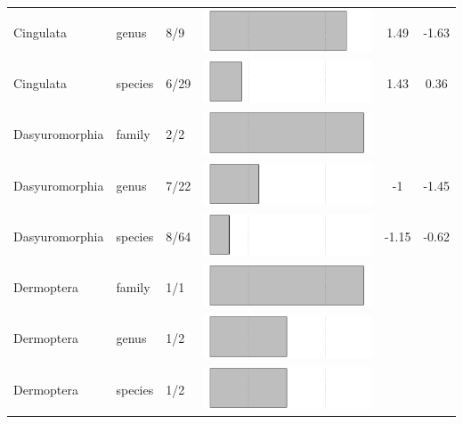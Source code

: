 \begin{longtable}{lL{1.8cm}C{2cm}lcc}
  Cingulata & genus & 8/9 & \includegraphics[width=0.20\linewidth, height=0.05\linewidth]{Missing_mammals/Table_figures/bar14.pdf} & 1.49 & -1.63 \\ 
  Cingulata & species & 6/29 & \includegraphics[width=0.20\linewidth, height=0.05\linewidth]{Missing_mammals/Table_figures/bar15.pdf} & 1.43 & 0.36 \\ 
  Dasyuromorphia & family & 2/2 & \includegraphics[width=0.20\linewidth, height=0.05\linewidth]{Missing_mammals/Table_figures/bar16.pdf} &   &   \\ 
  Dasyuromorphia & genus & 7/22 & \includegraphics[width=0.20\linewidth, height=0.05\linewidth]{Missing_mammals/Table_figures/bar17.pdf} & -1 & -1.45 \\ 
  Dasyuromorphia & species & 8/64 & \includegraphics[width=0.20\linewidth, height=0.05\linewidth]{Missing_mammals/Table_figures/bar18.pdf} & -1.15 & -0.62 \\ 
  Dermoptera & family & 1/1 & \includegraphics[width=0.20\linewidth, height=0.05\linewidth]{Missing_mammals/Table_figures/bar19.pdf} &   &   \\ 
  Dermoptera & genus & 1/2 & \includegraphics[width=0.20\linewidth, height=0.05\linewidth]{Missing_mammals/Table_figures/bar20.pdf} &   &   \\ 
  Dermoptera & species & 1/2 & \includegraphics[width=0.20\linewidth, height=0.05\linewidth]{Missing_mammals/Table_figures/bar21.pdf} &   &   \\ 

\end{longtable}

